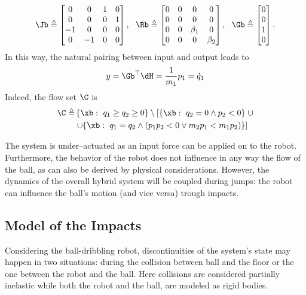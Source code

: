 \begin{equation}
    \Jb\triangleq
    \begin{bmatrix}
        0&0&1&0\\
        0&0&0&1\\
        -1&0&0&0\\
        0&-1&0&0
    \end{bmatrix},~~
    \Rb\triangleq
    \begin{bmatrix}
        0&0&0&0\\
        0&0&0&0\\
        0&0&\beta_1&0\\
        0&0&0&\beta_2
    \end{bmatrix},~~
    \Gb\triangleq
    \begin{bmatrix}
        0\\0\\1\\0
    \end{bmatrix}.
\end{equation}
%
In this way, the natural pairing between input and output leads to
%
\begin{equation}
    y = \Gb^\top\dH= \frac{1}{m_1}p_1=\dot{q}_1
\end{equation}
%
Indeed, the flow set $\C$ is 
%
\begin{align}\label{eq:flowset}
    \C \triangleq &\left\{\xb:~q_1\geq q_2\geq 0\right\}\setminus\left[\left\{\xb:~q_2 = 0\land p_2<0\right\}\right.\cup\\
    &\left.\cup\{\xb:~q_1 = q_2\land (p_1p_2<0\lor m_2p_1< m_1p_2)\}\right]
\end{align}
%
\begin{rmk}
    The system is under--actuated as an input force can be applied on to the robot. Furthermore, the behavior of the robot does not influence in any way the flow of the ball, as can also be derived by physical considerations. However, the dynamics of the overall hybrid system will be coupled during jumps: the robot can influence the ball's motion (and vice versa) trough impacts.
\end{rmk}
%
\subsection{Model of the Impacts}
%
Considering the ball-dribbling robot, discontinuities of the system's state may happen in two situations: during the collision between ball and the floor or the one between the robot and the ball. Here collisions are considered partially inelastic while both the robot and the ball, are modeled as rigid bodies.
%
